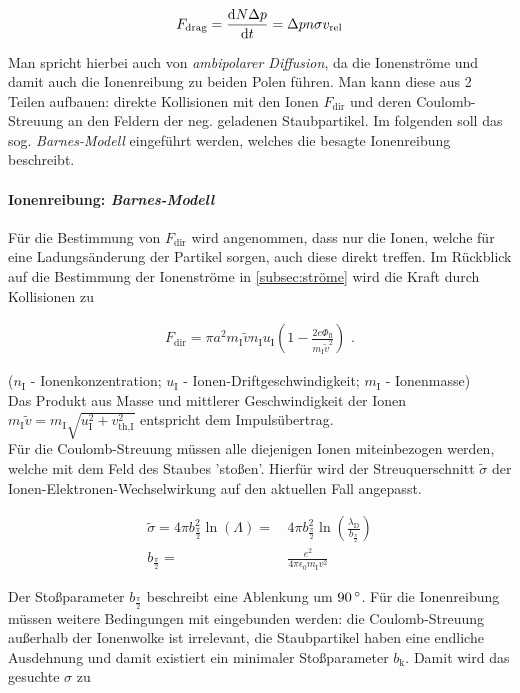 \documentclass[numbers=noenddot,a4paper]{scrartcl}
\newcommand{\degree}{^\circ}
\newcommand{\diff}{\textnormal{d}}
\newcommand{\ix}[1]{_\text{#1}}
\newcommand{\tilt}[1]{\textit{#1}}
\begin{document}
					\begin{align}
						F\ix{drag}=\frac{\diff N \Delta p}{\diff t}=\Delta p n \sigma v\ix{rel}
					\end{align}
					
				Man spricht hierbei auch von \tilt{ambipolarer Diffusion}, da die Ionenströme und damit auch die Ionenreibung zu beiden Polen führen. Man kann diese aus 2 Teilen aufbauen: direkte Kollisionen mit den Ionen $F\ix{dir}$ und deren Coulomb-Streuung an den Feldern der neg. geladenen Staubpartikel. Im folgenden soll das sog. \tilt{Barnes-Modell} eingeführt werden, welches die besagte Ionenreibung beschreibt.
				
				\paragraph{Ionenreibung: \tilt{Barnes-Modell}}
				
				Für die Bestimmung von $F\ix{dir}$ wird angenommen, dass nur die Ionen, welche für eine Ladungsänderung der Partikel sorgen, auch diese direkt treffen. Im Rückblick auf die Bestimmung der Ionenströme in \ref{subsec:ströme} wird die Kraft durch Kollisionen zu
				
					\begin{align}
						F\ix{dir}=\pi a^2m\ix{I}\tilde{v}n\ix{I}u\ix{I}\left(1-\frac{2e\Phi\ix{fl}}{m\ix{I}\tilde{v}^2}\right)\,\,.
					\end{align}
					
				($n\ix{I}$ - Ionenkonzentration; $u\ix{I}$ - Ionen-Driftgeschwindigkeit; $m\ix{I}$ - Ionenmasse)\\
				Das Produkt aus Masse und mittlerer Geschwindigkeit der Ionen $m\ix{I}\tilde{v}=m\ix{I}\sqrt{u\ix{I}^2+v\ix{th,I}^2}$ entspricht dem Impulsübertrag.\\
				Für die Coulomb-Streuung müssen alle diejenigen Ionen miteinbezogen werden, welche mit dem Feld des Staubes 'stoßen'. Hierfür wird der Streuquerschnitt $\tilde{\sigma}$ der Ionen-Elektronen-Wechselwirkung auf den aktuellen Fall angepasst.
				
					\begin{align}
						\tilde{\sigma}=4\pi b_{\frac{\pi}{2}}^2\ln\left(\Lambda\right)=&\,4\pi b_{\frac{\pi}{2}}^2\ln\left(\frac{\lambda\ix{D}}{b_{\frac{\pi}{2}}}\right) \\
						b_{\frac{\pi}{2}}=&\,\frac{e^2}{4\pi\epsilon\ix{0}m\ix{I}v^2} \nonumber
					\end{align}
					
				Der Stoßparameter $b_{\frac{\pi}{2}}$ beschreibt eine Ablenkung um $\unit[90]{\degree}$. Für die Ionenreibung müssen weitere Bedingungen mit eingebunden werden: die Coulomb-Streuung außerhalb der Ionenwolke ist irrelevant, die Staubpartikel haben eine endliche Ausdehnung und damit existiert ein minimaler Stoßparameter $b\ix{k}$. Damit wird das gesuchte $\sigma$ zu
				
\end{document}
